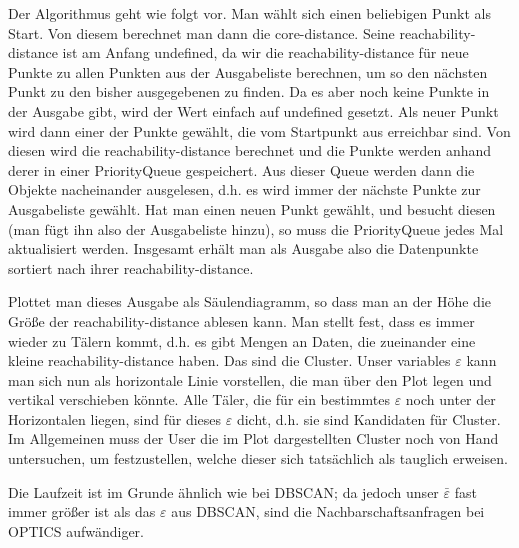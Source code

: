 Der Algorithmus geht wie folgt vor. Man wählt sich einen beliebigen Punkt
als Start. Von diesem berechnet man dann die core-distance. Seine 
reachability-distance ist am Anfang undefined, da wir die reachability-distance
für neue Punkte zu allen Punkten aus der Ausgabeliste berechnen, um so den
nächsten Punkt zu den bisher ausgegebenen zu finden. Da es aber noch keine 
Punkte in der Ausgabe gibt, wird der Wert einfach auf undefined gesetzt.
Als neuer Punkt wird dann einer der Punkte gewählt, die vom Startpunkt
aus erreichbar sind. Von diesen wird die reachability-distance berechnet und die
Punkte werden anhand derer in einer PriorityQueue gespeichert. Aus dieser
Queue werden dann die Objekte nacheinander ausgelesen, d.h. es wird immer
der nächste Punkte zur Ausgabeliste gewählt. Hat man einen neuen Punkt
gewählt, und besucht diesen (man fügt ihn also der Ausgabeliste hinzu), so
muss die PriorityQueue jedes Mal aktualisiert werden. Insgesamt erhält man
als Ausgabe also die Datenpunkte sortiert nach ihrer reachability-distance.

Plottet man dieses Ausgabe als Säulendiagramm, so dass man an der
Höhe die Größe der reachability-distance ablesen kann. Man stellt fest, dass
es immer wieder zu Tälern kommt, d.h. es gibt Mengen an Daten, die zueinander 
eine kleine reachability-distance haben. Das sind die Cluster. Unser variables
\(\varepsilon\) kann man sich nun als horizontale Linie vorstellen, die man
über den Plot legen und vertikal verschieben könnte. Alle Täler, die für ein
bestimmtes \(\varepsilon\) noch unter der Horizontalen liegen, sind für dieses
\(\varepsilon\) dicht, d.h. sie sind Kandidaten für Cluster. Im Allgemeinen muss
der User die im Plot dargestellten Cluster noch von Hand untersuchen, um
festzustellen, welche dieser sich tatsächlich als tauglich erweisen.

Die Laufzeit ist im Grunde ähnlich wie bei DBSCAN; da jedoch unser
\(\bar{\varepsilon}\) fast immer größer ist als das \(\varepsilon\) aus
DBSCAN, sind die Nachbarschaftsanfragen bei OPTICS aufwändiger.

